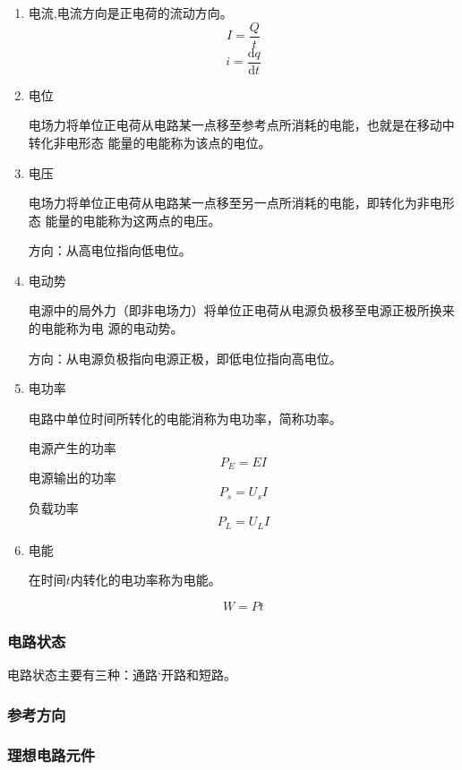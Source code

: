 \begin{enumerate}
\item 电流,电流方向是正电荷的流动方向。
\[
    I = \frac{Q}{t}
\]
\[
    i = \frac{\mathrm{d} q}{\mathrm{d} t} 
\]

\item 电位 

电场力将单位正电荷从电路某一点移至参考点所消耗的电能，也就是在移动中转化非电形态
能量的电能称为该点的电位。

\item 电压

电场力将单位正电荷从电路某一点移至另一点所消耗的电能，即转化为非电形态
能量的电能称为这两点的电压。

方向：从高电位指向低电位。

\item 电动势

电源中的局外力（即非电场力）将单位正电荷从电源负极移至电源正极所换来的电能称为电
源的电动势。

方向：从电源负极指向电源正极，即低电位指向高电位。

\item 电功率

电路中单位时间所转化的电能消称为电功率，简称功率。

电源产生的功率
\[
    P_E=EI
\]
电源输出的功率
\[
    P_s=U_sI
\]
负载功率
\[
    P_L=U_LI
\]

\item 电能

在时间$t$内转化的电功率称为电能。

\[
    W=Pt
\]

\end{enumerate}

\subsubsection{电路状态}

电路状态主要有三种：通路‘开路和短路。

\subsubsection{参考方向}

\begin{center}
\end{center}

\subsubsection{理想电路元件}

